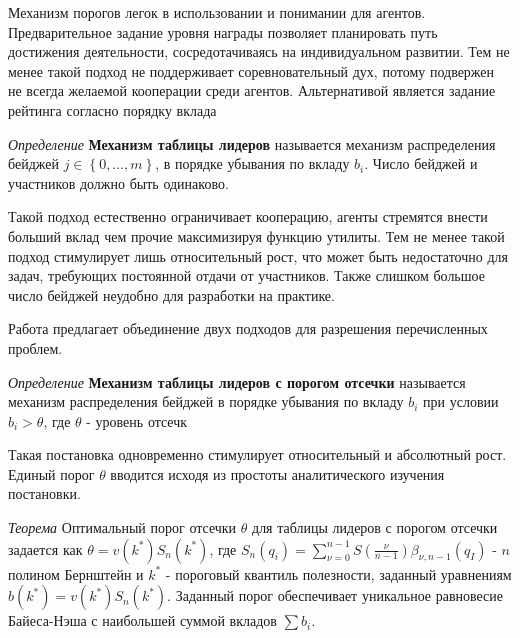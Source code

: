 Механизм порогов легок в использовании и понимании для агентов. Предварительное задание уровня награды позволяет
планировать путь достижения деятельности, сосредотачиваясь на индивидуальном развитии. Тем не менее 
такой подход не поддерживает соревновательный дух, потому подвержен не всегда желаемой кооперации среди агентов.
Альтернативой является задание рейтинга согласно порядку вклада

\textit{Определение} \textbf{Механизм таблицы лидеров} называется механизм распределения бейджей  $j \in \left\{0,\dots,m\right\}$,
в порядке убывания по вкладу $b_i$. Число бейджей и участников должно быть одинаково.

Такой подход естественно ограничивает кооперацию, агенты стремятся внести больший вклад чем прочие максимизируя функцию утилиты.
Тем не менее такой подход стимулирует лишь относительный рост, что может быть недостаточно для задач, требующих постоянной отдачи от участников. 
Также слишком большое число бейджей неудобно для разработки на практике. 

Работа \cite{Easley2013} предлагает объединение двух подходов для разрешения перечисленных проблем.

\textit{Определение} \textbf{Механизм таблицы лидеров с порогом отсечки} называется механизм распределения бейджей
в порядке убывания по вкладу $b_i$ при условии $b_i > \theta$, где $\theta$ - уровень отсечк

Такая постановка одновременно стимулирует относительный и абсолютный рост. Единый порог $\theta$ вводится исходя из простоты
аналитического изучения постановки. 

\textit{Теорема} Оптимальный порог отсечки $\theta$ для таблицы лидеров с порогом отсечки задается как $\theta=v(k^*) S_n(k^*)$,
где $S_n(q_i) = \sum_{\nu=0}^{n-1} S\left(\frac{\nu}{n-1}\right) \beta_{\nu,n-1} (q_I)$ - $n$ полином Бернштейн и $k^*$ - пороговый 
квантиль полезности, заданный уравнениям $b(k^*) = v(k^*) S_n(k^*)$. Заданный порог обеспечивает уникальное равновесие Байеса-Нэша
с наибольшей суммой вкладов $\sum b_i$.




